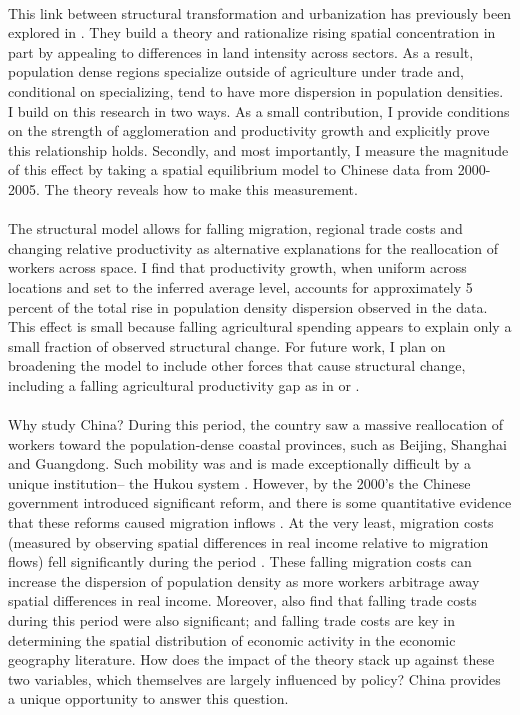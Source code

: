 \documentclass[]{article}
\theoremstyle{plain}
\begin{document}
\paragraph*{}
This link between structural transformation and urbanization has previously been explored in \citet{urbstruct}. They build a theory and rationalize rising spatial concentration in part by appealing to differences in land intensity across sectors. As a result, population dense regions specialize outside of agriculture under trade and, conditional on specializing, tend to have more dispersion in population densities. I build on this research in two ways. As a small contribution, I  provide conditions on the strength of agglomeration and productivity growth and explicitly prove this relationship holds. Secondly, and most importantly, I measure the magnitude of this effect by taking a spatial equilibrium model to Chinese data from 2000-2005. The theory reveals how to make this measurement. 
\paragraph*{}
The structural model allows for falling migration, regional trade costs and changing relative productivity as alternative explanations for the reallocation of workers across space. I find that productivity growth, when uniform across locations and set to the inferred average level, accounts for approximately 5 percent of the total rise in population density dispersion observed in the data. This effect is small because falling agricultural spending appears to explain only a small fraction of observed structural change. For future work, I plan on broadening the model to include other forces that cause structural change, including a falling agricultural productivity gap as in \citet{AgProdGap} or \citet{restyangzhu}. 
 \paragraph*{}
 Why study China? During this period, the country saw a massive reallocation of workers toward the population-dense coastal provinces, such as Beijing, Shanghai and Guangdong. Such mobility was and is made exceptionally difficult by a unique institution-- the Hukou system \citep{Chinashukou60} \citep{hukoulaboutcome}. However, by the 2000's the Chinese government introduced significant reform, and there is some quantitative evidence that these reforms caused migration inflows \citep{Fan2018HukouRI}. At the very least, migration costs (measured by observing spatial differences in real income relative to migration flows) fell significantly during the period \citep{tombezhu}. These falling migration costs can increase the dispersion of population density as more workers arbitrage away spatial differences in real income. Moreover, \citet{tombezhu} also find that falling trade costs during this period were also significant; and falling trade costs are key in determining the spatial distribution of economic activity in the economic geography literature. How does the impact of the theory stack up against these two variables, which themselves are largely influenced by policy? China provides a unique opportunity to answer this question.
\end{document}
